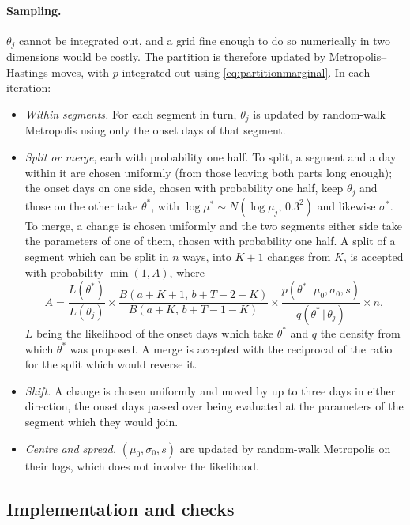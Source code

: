 \documentclass[11pt,a4paper]{article}
\newcommand{\given}{\,|\,}
\begin{document}
\paragraph{Sampling.} $\theta_j$ cannot be integrated out, and a grid fine
enough to do so numerically in two dimensions would be costly. The partition
is therefore updated by Metropolis--Hastings moves, with $p$ integrated out
using \eqref{eq:partitionmarginal}. In each iteration:
\begin{itemize}[itemsep=2pt]
\item \emph{Within segments.} For each segment in turn, $\theta_j$ is updated
by random-walk Metropolis using only the onset days of that segment.
\item \emph{Split or merge}, each with probability one half. To split, a
segment and a day within it are chosen uniformly (from those leaving both
parts long enough); the onset days on one side, chosen with probability one
half, keep $\theta_j$ and those on the other take $\theta^*$, with
$\log\mu^*\sim N(\log\mu_j,\,0.3^2)$ and likewise $\sigma^*$. To merge, a
change is chosen uniformly and the two segments either side take the
parameters of one of them, chosen with probability one half. A split of a
segment which can be split in $n$ ways, into $K+1$ changes from $K$, is
accepted with probability $\min(1,A)$, where
\begin{equation}\label{eq:splitratio}
A=\frac{L(\theta^*)}{L(\theta_j)}\times
\frac{B(a+K+1,\,b+T-2-K)}{B(a+K,\,b+T-1-K)}\times
\frac{p(\theta^*\given\mu_0,\sigma_0,s)}{q(\theta^*\given\theta_j)}\times n,
\end{equation}
$L$ being the likelihood of the onset days which take $\theta^*$ and $q$ the
density from which $\theta^*$ was proposed. A merge is accepted with the
reciprocal of the ratio for the split which would reverse it.
\item \emph{Shift.} A change is chosen uniformly and moved by up to three
days in either direction, the onset days passed over being evaluated at the
parameters of the segment which they would join.
\item \emph{Centre and spread.} $(\mu_0,\sigma_0,s)$ are updated by random-walk
Metropolis on their logs, which does not involve the likelihood.
\end{itemize}

\subsection{Implementation and checks}
\end{document}
